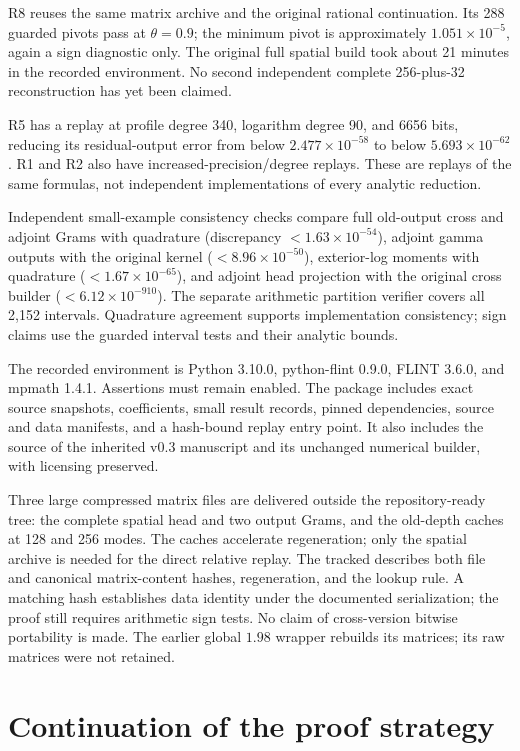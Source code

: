 \documentclass[11pt]{article}
\theoremstyle{remark}\newtheorem{remark}[theorem]{Remark}
\newcommand{\rec}[1]{\texttt{\detokenize{#1}}}
\begin{document}
R8 reuses the same matrix archive and the original rational continuation. Its 288 guarded pivots pass at $\theta=0.9$; the minimum pivot is approximately $1.051\times10^{-5}$, again a sign diagnostic only. The original full spatial build took about 21 minutes in the recorded environment. No second independent complete 256-plus-32 reconstruction has yet been claimed.

R5 has a replay at profile degree 340, logarithm degree 90, and 6656 bits, reducing its residual-output error from below $2.477\times10^{-58}$ to below $5.693\times10^{-62}$. R1 and R2 also have increased-precision/degree replays. These are replays of the same formulas, not independent implementations of every analytic reduction.

Independent small-example consistency checks compare full old-output cross and adjoint Grams with quadrature (discrepancy $<1.63\times10^{-54}$), adjoint gamma outputs with the original kernel ($<8.96\times10^{-50}$), exterior-log moments with quadrature ($<1.67\times10^{-65}$), and adjoint head projection with the original cross builder ($<6.12\times10^{-910}$). The separate arithmetic partition verifier covers all 2,152 intervals. Quadrature agreement supports implementation consistency; sign claims use the guarded interval tests and their analytic bounds.

The recorded environment is Python 3.10.0, python-flint 0.9.0, FLINT 3.6.0, and mpmath 1.4.1. Assertions must remain enabled. The package includes exact source snapshots, coefficients, small result records, pinned dependencies, source and data manifests, and a hash-bound replay entry point. It also includes the source of the inherited v0.3 manuscript and its unchanged numerical builder, with licensing preserved.

Three large compressed matrix files are delivered outside the repository-ready tree: the complete spatial head and two output Grams, and the old-depth caches at 128 and 256 modes. The caches accelerate regeneration; only the spatial archive is needed for the direct relative replay. The tracked \rec{ARCHIVES.md} describes both file and canonical matrix-content hashes, regeneration, and the \rec{STORAGE_DEPTH_ARCHIVES} lookup rule. A matching hash establishes data identity under the documented serialization; the proof still requires arithmetic sign tests. No claim of cross-version bitwise portability is made. The earlier global $1.98$ wrapper rebuilds its matrices; its raw matrices were not retained.

\section{Continuation of the proof strategy}\label{sec:next}
\end{document}
